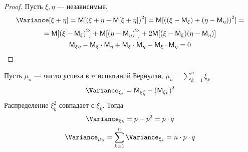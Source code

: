 \begin{proof}
  Пусть $\xi, \eta$ --- независимые.
  \[
  \Variance [\xi + \eta] = \MExpect [{(\xi + \eta - \MExpect [\xi + \eta])}^2] = \MExpect [{((\xi - \MExpect_\xi) + (\eta - \MExpect_{\eta}))}^2] =
  \]
  \[
    = \mathsf{M} [{(\xi - \mathsf{M}_{\xi})}^2] + \mathsf{M} [{(\eta - \mathsf{M}_{\eta})}^2] + 2 \mathsf{M} [(\xi - \mathsf{M}_{\xi})(\eta - \mathsf{M}_{\eta})]
  \]
  \[
    \mathsf{M}_{\xi \eta} - \mathsf{M}_{\xi} \cdot \mathsf{M}_{\eta} + \mathsf{M}_{\xi} \cdot \mathsf{M}_{\eta} - \mathsf{M}_{\xi} \cdot \mathsf{M}_{\eta} = 0
  \]
\end{proof}
\begin{example}
  Пусть $\mu_n$ --- число успеха в $n$ испытаний Бернулли, $\mu_n = \sum\limits_{k = 1}^n \xi_k$
  \[
    \Variance_{\xi_k} = \MExpect_{\xi^2_k} - {(\MExpect_{\xi_k})}^2
  \]
  Распределение $\xi_k^2$ совпадает с $\xi_k$. Тогда
  \[
    \Variance_{\xi_k} = p - p^2 = p \cdot q
  \]
  \[
    \Variance_{\mu_n} = \sum\limits_{k = 1}^n \Variance_{\xi_k} = n \cdot p \cdot q
  \]
\end{example}

